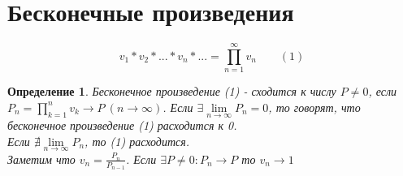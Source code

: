 \documentclass[12pt, oneside]{article}
\theoremstyle{plain}
\newtheorem{Definition}{Определение}
\begin{document}
	\section{Бесконечные произведения}
	\[
		v_{1} * v_{2} * ... *v_{n} * ... = \prod_{n = 1}^{\infty}v_{n} \qquad(1)
	\]
	\begin{Definition}
		Бесконечное произведение (1) - сходится к числу $P \neq 0$, если
		$P_{n} = \prod\limits_{k = 1}^{n}v_{k} \to P\ ({n\to\infty})$. Если $\exists
		\lim\limits_{n\to\infty}P_{n} = 0$, то говорят, что бесконечное произведение
		(1) расходится к 0. \\
		Если $\nexists \lim\limits_{n\to\infty}P_{n}$, то (1) расходится.\\
		Заметим что $v_{n} = \frac{P_{n}}{P_{n-1}}$. 
		Если $\exists P \neq 0 : P_{n} \to P$ то $v_{n} \to 1$
	\end{Definition}
\end{document}
